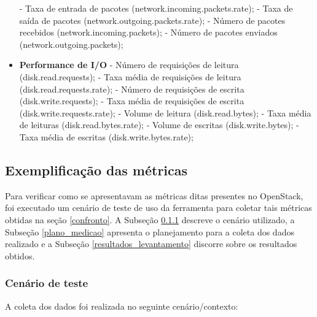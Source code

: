 \documentclass[conference]{IEEEtran}
\begin{document}
\begin{itemize}
    \subitem - Taxa de entrada de pacotes (network.incoming.packets.rate);
    \subitem - Taxa de saída de pacotes (network.outgoing.packets.rate);
    \subitem - Número de pacotes recebidos (network.incoming.packets);
    \subitem - Número de pacotes enviados (network.outgoing.packets);
  \item \textbf{Performance de I/O} 
    \subitem - Número de requisições de leitura (disk.read.requests);
    \subitem - Taxa média de requisições de leitura (disk.read.requests.rate);
    \subitem - Número de requisições de escrita (disk.write.requests);
    \subitem - Taxa média de requisições de escrita (disk.write.requests.rate);
    \subitem - Volume de leitura (disk.read.bytes);
    \subitem - Taxa média de leituras (disk.read.bytes.rate);
    \subitem - Volume de escritas (disk.write.bytes);
    \subitem - Taxa média de escritas (disk.write.bytes.rate);
 \end{itemize}  

  \subsection{Exemplificação das métricas} 
    Para verificar como se apresentavam as métricas ditas presentes no OpenStack, foi executado um cenário de teste de uso da ferramenta
    para coletar tais métricas obtidas na seção \ref{confronto}. 
    A Subseção \ref{cenario} descreve o cenário utilizado, a Subseção \ref{plano_medicao} apresenta o planejamento para a
    coleta dos dados realizado e a Subseção \ref{resultados_levantamento} discorre sobre os resultados obtidos.
  
    \subsubsection{\textbf{Cenário de teste}} \label{cenario}
	
	A coleta dos dados foi realizada no seguinte cenário/contexto:
	
\end{document}
